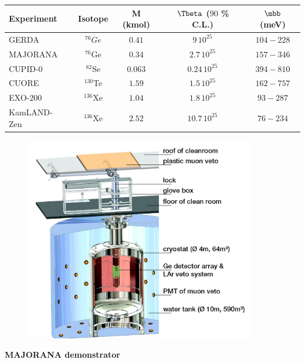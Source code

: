 \begin{center}
  \begin{table}
    \begin{tabular}{l  c  c  c  c}
      \hline \hline
      Experiment &  Isotope  & M (kmol)&$\Tbeta$ ($90$ \% C.L.)&  $\mbb$ (meV)\\
      \hline
      GERDA~\cite{art:GERDA2019}        & $^{76}Ge$  & $0.41$  & $9\,10^{25}$          & $104-228$    \\
      MAJORANA~\cite{art:majorana2019}  & $^{76}$Ge  & $0.34$  & $2.7\,10^{25}$        & $157-346$    \\
      CUPID-$0$~\cite{art:CUPID2018}    & $^{82}$Se  & $0.063$ & $0.24\,10^{25}$       & $394-810$    \\
      CUORE~\cite{art:CUORE2018}        & $^{130}$Te & $1.59$  & $1.5\,10^{25}$        & $162-757$    \\
      EXO-$200$~\cite{art:EXO2018}      & $^{136}$Xe & $1.04$  & $1.8\,10^{25}$        & $93-287$     \\
      KamLAND-Zen~\cite{art:KamLAND2016}& $^{136}$Xe & $2.52$  & $10.7\,10^{25}$       & $76-234$     \\
      \hline \hline
    \end{tabular}
  \end{table}
\end{center}


\begin{figure}
  \centering
  \includegraphics[width=10cm]{0nubbexperiments/fig_0nubbexperiments/GERDA.png}
  \caption{}
  \label{fig:GERDA}
\end{figure}


\textbf{MAJORANA demonstrator}

